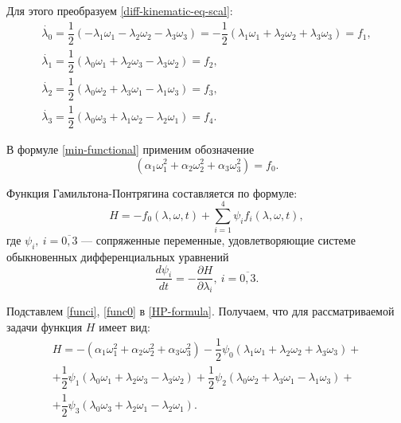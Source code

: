 \documentclass[14pt]{extreport}
\begin{document}
Для этого преобразуем \eqref{diff-kinematic-eq-scal}:
\begin{equation}
\label{funci}
\begin{split}
\dot{\lambda_{0}} = \dfrac{1}{2}(-\lambda_{1}\omega_{1} - \lambda_{2}\omega_{2} - \lambda_{3}\omega_{3})=
-\dfrac{1}{2}(\lambda_{1}\omega_{1} + \lambda_{2}\omega_{2} + \lambda_{3}\omega_{3})=f_{1},\\
\dot{\lambda_{1}} = \dfrac{1}{2}(\lambda_{0}\omega_{1} + \lambda_{2}\omega_{3} - \lambda_{3}\omega_{2})=f_{2},\\
\dot{\lambda_{2}} = \dfrac{1}{2}(\lambda_{0}\omega_{2} + \lambda_{3}\omega_{1} - \lambda_{1}\omega_{3})=f_3,\\
\dot{\lambda_{3}} = \dfrac{1}{2}(\lambda_{0}\omega_{3} + \lambda_{1}\omega_{2} - \lambda_{2}\omega_{1})=f_4.
\end{split}
\end{equation}

В формуле \eqref{min-functional} применим обозначение 
\begin{equation}
\label{func0}
(\alpha_{1}\omega_{1}^{2}+\alpha_{2}\omega_{2}^{2}+\alpha_{3}\omega_{3}^{2})=f_0.
\end{equation}

Функция Гамильтона-Понтрягина составляется по формуле:
\begin{equation}
\label{HP-formula}
H=-f_0(\lambda,\omega,t)+\sum \limits_{i=1}^{4}\psi_i f_i(\lambda,\omega,t),
\end{equation}
где $\psi_{i},\ i=\overline{0,3}$ — сопряженные переменные, удовлетворяющие системе обыкновенных дифференциальных уравнений
\begin{equation}
\label{linked-var-formula}
\dfrac{d\psi_i}{dt}=-\dfrac{\partial H}{\partial \lambda_i},\ i=\overline{0,3}.
\end{equation}

Подставлем \eqref{funci}, \eqref{func0} в \eqref{HP-formula}. Получаем, что для рассматриваемой задачи функция $H$ имеет вид:
\begin{equation}
\label{HP-eq}
\begin{split}
H = -(\alpha_{1}\omega_{1}^{2}+\alpha_{2}\omega_{2}^{2}+\alpha_{3}\omega_{3}^{2})
-\dfrac{1}{2}\psi_{0}(\lambda_{1}\omega_{1}+\lambda_{2}\omega_{2}+\lambda_{3}\omega_{3})+\\
+\dfrac{1}{2}\psi_{1}(\lambda_{0}\omega_{1}+\lambda_{2}\omega_{3}-\lambda_{3}\omega_{2})
+\dfrac{1}{2}\psi_{2}(\lambda_{0}\omega_{2}+\lambda_{3}\omega_{1}-\lambda_{1}\omega_{3})+\\
+\dfrac{1}{2}\psi_{3}(\lambda_{0}\omega_{3}+\lambda_{2}\omega_{1}-\lambda_{2}\omega_{1}).
\end{split}
\end{equation}
\end{document}
